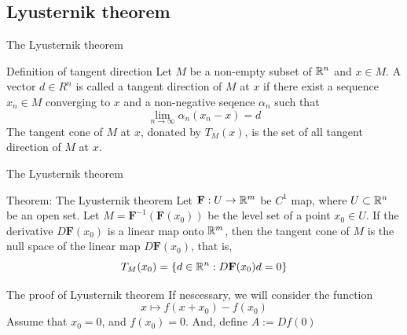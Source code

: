 \subsection{Lyusternik theorem}

\begin{frame}{The Lyusternik theorem}
    \begin{block}{Definition of tangent direction}
        Let $M$ be a non-empty subset of $\mathbb{R}^n$ and $x \in M$. A vector $d \in R^n$ is called a tangent direction of $M$ at $x$ if there exist a sequence $x_n \in M$ converging to $x$ and a non-negative seqence $\alpha_n$ such that
        \begin{equation}
            \underset{n\rightarrow\infty}{\lim}\alpha_n(x_n-x)=d
        \end{equation}
        The tangent cone of $M$ at $x$, donated by $T_M(x)$, is the set of all tangent direction of $M$ at $x$.
    \end{block}
\end{frame}

\begin{frame}{The Lyusternik theorem}
    \begin{block}{Theorem: The Lyusternik theorem}
        Let $\mathbf{F}: U \rightarrow \mathbb{R}^m$ be $C^1$ map, where $U \subset \mathbb{R}^n$ be an open set. Let $M = \mathbf{F}^{-1}(\mathbf{F}(x_0))$ be the level set of a point $x_0 \in U$. If the derivative $D\mathbf{F}(x_0)$ is a linear map onto $\mathbb{R}^m$, then the tangent cone of $M$ is the null space of the linear map $D\mathbf{F}(x_0)$, that is,
        \begin{equation}
            T_M(x_0) = \{d \in \mathbb{R}^n: D\mathbf{F}(x_0)d=0\}
        \end{equation}
    \end{block}
\end{frame}

\begin{frame}{The proof of Lyusternik theorem}
    If nescessary, we will consider the function
    \begin{equation}
        x \mapsto f(x + x_0) - f(x_0)
    \end{equation}
    Assume that $x_0 = 0$, and $f(x_0) = 0$. And, define $A:= Df(0)$
\end{frame}

